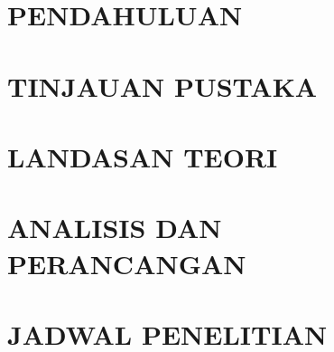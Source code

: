 \documentclass[proposal]{ugmskripsi}
\begin{document}
\cleardoublepage{}


\cleardoublepage{}


\cleardoublepage{}
\pagestyle{myheadings}
\setcounter{page}{1}

\chapter{PENDAHULUAN}
    

\chapter{TINJAUAN PUSTAKA}
    

\chapter{LANDASAN TEORI}
    

\chapter{ANALISIS DAN PERANCANGAN}
    

\chapter{JADWAL PENELITIAN}
    

%     
\end{document}
